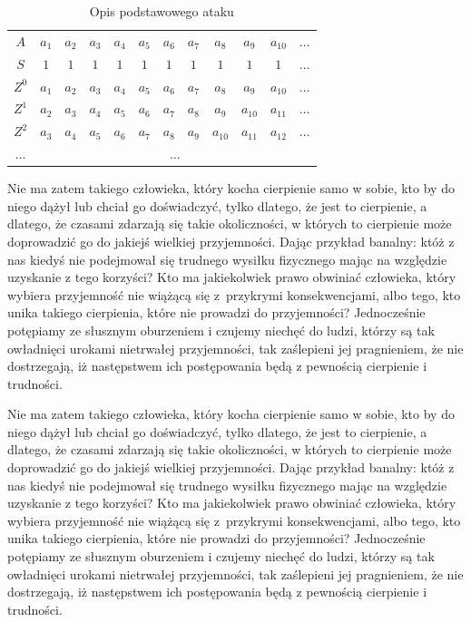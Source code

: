 \documentclass[12pt]{mwbk}
\theoremstyle{plain}
\theoremstyle{definition}
\theoremstyle{remark}
\begin{document}
\begin{table}
	\centering
	\caption{Opis podstawowego ataku}
	\label{shgen-attack1-basic-idea1}
	{\small
	\begin{tabular}{|c|ccccccccccc|}
\hline
$A$ & $a_{1}$ & $a_{2}$ & $a_{3}$ & $a_{4}$ & $a_{5}$ & $a_{6}$ & $a_{7}$ & $a_{8}$ & $a_{9}$ & $a_{10}$ & $\ldots$ \\
$S$ & $1$ & $1$ & $1$ & $1$ & $1$ & $1$ & $1$ & $1$ & $1$ & $1$ & $\ldots$ \\ \cline{2-12}
$Z^0$ & $a_{1}$ & $a_{2}$ & $a_{3}$ & $a_{4}$ & $a_{5}$ & $a_{6}$ & $a_{7}$ & $a_{8}$ & $a_{9}$ & $a_{10}$ & $\ldots$ \\
$Z^1$ & $a_{2}$ & $a_{3}$ & $a_{4}$ & $a_{5}$ & $a_{6}$ & $a_{7}$ & $a_{8}$ & $a_{9}$ & $a_{10}$ & $a_{11}$ & $\ldots$ \\
$Z^2$ & $a_{3}$ & $a_{4}$ & $a_{5}$ & $a_{6}$ & $a_{7}$ & $a_{8}$ & $a_{9}$ & $a_{10}$ & $a_{11}$ & $a_{12}$ & $\ldots$ \\
$\ldots$ & \multicolumn{11}{c|}{$\ldots$} \\
\hline
\end{tabular}
}
\end{table}




Nie ma zatem takiego człowieka, który kocha cierpienie samo w sobie, 
kto by do niego dążył lub chciał go doświadczyć, tylko dlatego, że
jest to cierpienie, a dlatego, że czasami zdarzają się takie 
okoliczności, w których to cierpienie może doprowadzić 
go do jakiejś wielkiej przyjemności. 
Dając przykład banalny: któż z nas kiedyś nie podejmował 
się trudnego wysiłku fizycznego mając na względzie 
uzyskanie z tego korzyści? 
Kto ma jakiekolwiek prawo obwiniać człowieka, 
który wybiera przyjemność nie wiążącą się z~przykrymi 
konsekwencjami, albo tego, kto unika takiego cierpienia, 
które nie prowadzi do przyjemności? 
Jednocześnie potępiamy ze słusznym oburzeniem i czujemy 
niechęć do ludzi, którzy są tak owładnięci urokami nietrwałej 
przyjemności, tak zaślepieni jej pragnieniem, 
że nie dostrzegają, iż następstwem ich 
postępowania będą z pewnością cierpienie i trudności.



Nie ma zatem takiego człowieka, który kocha cierpienie samo w sobie, 
kto by do niego dążył lub chciał go doświadczyć, tylko dlatego, że
jest to cierpienie, a dlatego, że czasami zdarzają się takie 
okoliczności, w których to cierpienie może doprowadzić 
go do jakiejś wielkiej przyjemności. 
Dając przykład banalny: któż z nas kiedyś nie podejmował 
się trudnego wysiłku fizycznego mając na względzie 
uzyskanie z tego korzyści? 
Kto ma jakiekolwiek prawo obwiniać człowieka, 
który wybiera przyjemność nie wiążącą się z~przykrymi 
konsekwencjami, albo tego, kto unika takiego cierpienia, 
które nie prowadzi do przyjemności? 
Jednocześnie potępiamy ze słusznym oburzeniem i czujemy 
niechęć do ludzi, którzy są tak owładnięci urokami nietrwałej 
przyjemności, tak zaślepieni jej pragnieniem, 
że nie dostrzegają, iż następstwem ich 
postępowania będą z pewnością cierpienie i trudności.
\end{document}
